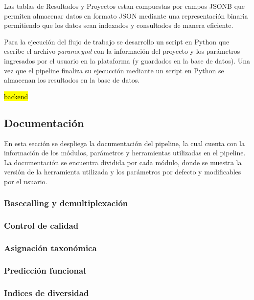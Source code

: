 Las tablas de Resultados y Proyectos estan compuestas por campos JSONB que permiten almacenar datos en formato JSON mediante una representación binaria permitiendo que los datos sean indexados y consultados de manera eficiente. 

Para la ejecución del flujo de trabajo se desarrollo un script en Python que escribe el archivo \textit{params.yml} con la información del proyecto y los parámetros ingresados por el usuario en la plataforma (y guardados en la base de datos).
Una vez que el pipeline finaliza su ejecucción mediante un script en Python se almacenan los resultados en la base de datos.

\hl{backend}
\subsection{Documentación}
En esta sección se despliega la documentación del pipeline, la cual cuenta con la información de los módulos, parámetros y herramientas utilizadas en el pipeline. La documentación se encuentra dividida por cada módulo, donde se muestra la versión de la herramienta utilizada y los parámetros por defecto y modificables por el usuario.
\subsubsection{Basecalling y demultiplexación}
\subsubsection{Control de calidad}
\subsubsection{Asignación taxonómica}
\subsubsection{Predicción funcional}
\subsubsection{Indices de diversidad}

